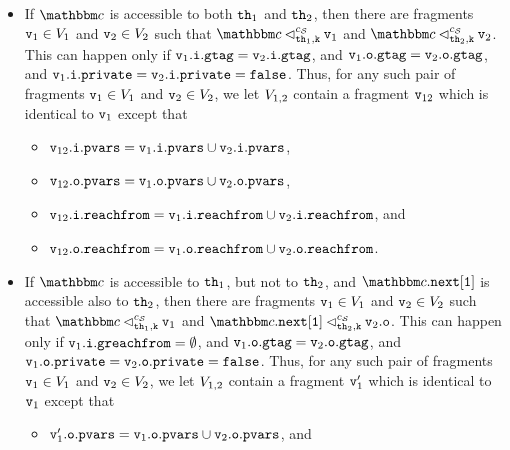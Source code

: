 \begin{itemize}
\item If $\cell$ is accessible to both ${\tt th}_1$ and ${\tt th}_2$, then
  there are fragments $\mathtt{v}_1 \in V_1$ and $\mathtt{v}_2 \in V_2$
  such that $\cell \lsatfrag{\klevel}{\thread_1}{\sconf} \frag_1$ and $\cell \lsatfrag{\klevel}{\thread_2}{\sconf} \frag_2$.
  This can happen only if
  $\mathtt{v}_1.\mathtt{i}.\mathtt{gtag} = \mathtt{v}_2.\mathtt{i}.\mathtt{gtag}$,
  and $\mathtt{v}_1.\mathtt{o}.\mathtt{gtag} = \mathtt{v}_2.\mathtt{o}.\mathtt{gtag}$,
  and $\mathtt{v}_1.\mathtt{i}.\mathtt{private} = \mathtt{v}_2.\mathtt{i}.\mathtt{private} = {\tt false}$.
  Thus, for any such pair of fragments
  $\mathtt{v}_1 \in V_1$ and $\mathtt{v}_2 \in V_2$, we let
  $V_{1,2}$ contain a fragment
 $\mathtt{v}_{12}$ which is identical to $\mathtt{v}_1$ except that
  \begin{itemize}
  \item $\mathtt{v}_{12}.\mathtt{i}.\mathtt{pvars} = \mathtt{v}_1.\mathtt{i}.\mathtt{pvars} \cup \mathtt{v}_2.\mathtt{i}.\mathtt{pvars}$, 
  \item  $\mathtt{v}_{12}.\mathtt{o}.\mathtt{pvars} = \mathtt{v}_1.\mathtt{o}.\mathtt{pvars} \cup \mathtt{v}_2.\mathtt{o}.\mathtt{pvars}$,
  \item $\mathtt{v}_{12}.\mathtt{i}.\mathtt{reachfrom} = \mathtt{v}_{1}.\mathtt{i}.\mathtt{reachfrom} \cup \mathtt{v}_{2}.\mathtt{i}.\mathtt{reachfrom}$, and
   \item $\mathtt{v}_{12}.\mathtt{o}.\mathtt{reachfrom} = \mathtt{v}_{1}.\mathtt{o}.\mathtt{reachfrom} \cup \mathtt{v}_{2}.\mathtt{o}.\mathtt{reachfrom}$.
    \end{itemize}
\item If $\cell$ is accessible to ${\tt th}_1$, but not to ${\tt th}_2$, and
  $\cell.{\tt next[1]}$ is accessible also to ${\tt th}_2$, then
  there are fragments $\mathtt{v}_1 \in V_1$ and $\mathtt{v}_2 \in V_2$
  such that $\cell \lsatfrag{\klevel}{\thread_1}{\sconf} \frag_1$ and
  $\cell.{\tt next[1]} \lsatfrag{\klevel}{\thread_2}{\sconf} \outof{\frag_2}$.
  This can happen only if
  $\mathtt{v}_1.\mathtt{i}.\mathtt{greachfrom} =  \emptyset$,
  and $\mathtt{v}_1.\mathtt{o}.\mathtt{gtag} = \mathtt{v}_2.\mathtt{o}.\mathtt{gtag}$,
  and $\mathtt{v}_1.\mathtt{o}.\mathtt{private} = \mathtt{v}_2.\mathtt{o}.\mathtt{private} = {\tt false}$.
  Thus, for any such pair of fragments
  $\mathtt{v}_1 \in V_1$ and $\mathtt{v}_2 \in V_2$, we let
  $V_{1,2}$ contain a fragment
 $\mathtt{v}_{1}'$ which is identical to $\mathtt{v}_1$ except that
    \begin{itemize}
  \item  $\mathtt{v}_1'.\mathtt{o}.\mathtt{pvars} = \mathtt{v}_1.\mathtt{o}.\mathtt{pvars} \cup \mathtt{v}_2.\mathtt{o}.\mathtt{pvars}$, and

\end{itemize}
\end{itemize}
